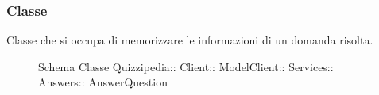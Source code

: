 \subsubsection{Classe }
Classe che si occupa di memorizzare le informazioni di un domanda risolta.
\begin{figure}[H]
\centering
\noindent{}
\caption[Schema Classe AnswerQuestion]{Schema Classe Quizzipedia:: Client:: ModelClient:: Services:: Answers:: AnswerQuestion}
\end{figure}
